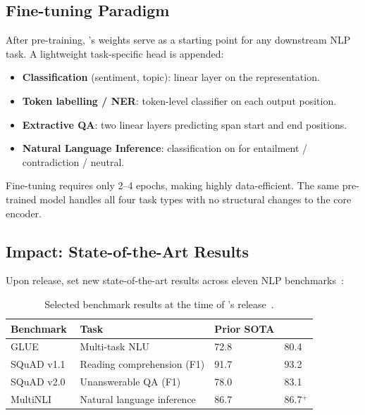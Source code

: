 \subsection{Fine-tuning Paradigm}

After pre-training, \bert{}'s weights serve as a starting point for any
downstream NLP task. A lightweight task-specific head is appended:

\begin{itemize}[leftmargin=2em, itemsep=2pt]
  \item \textbf{Classification} (sentiment, topic): linear layer on the
        \cls{} representation.
  \item \textbf{Token labelling / NER}: token-level classifier on each output
        position.
  \item \textbf{Extractive QA}: two linear layers predicting span start and end
        positions.
  \item \textbf{Natural Language Inference}: classification on \cls{} for
        entailment / contradiction / neutral.
\end{itemize}

Fine-tuning requires only 2--4 epochs, making \bert{} highly data-efficient.
The same pre-trained model handles all four task types with no structural
changes to the core encoder.

\subsection{Impact: State-of-the-Art Results}

Upon release, \bert{} set new state-of-the-art results across eleven NLP
benchmarks~\cite{devlin2019bert}:

\begin{table}[H]
\centering
\caption{Selected benchmark results at the time of \bert{}'s
  release~\cite{devlin2019bert}.}
\label{tab:results}
\begin{tabular}{llll}
  \toprule
  \textbf{Benchmark} & \textbf{Task} & \textbf{Prior SOTA} & \textbf{\bert{}} \\
  \midrule
  GLUE~\cite{wang2018glue}
    & Multi-task NLU            & 72.8  & 80.4 \\
  SQuAD v1.1~\cite{rajpurkar2016squad}
    & Reading comprehension (F1) & 91.7  & 93.2 \\
  SQuAD v2.0~\cite{rajpurkar2018squad2}
    & Unanswerable QA (F1)       & 78.0  & 83.1 \\
  MultiNLI~\cite{williams2018multinli}
    & Natural language inference & 86.7  & 86.7$^{+}$ \\
  \bottomrule
\end{tabular}
\end{table}

